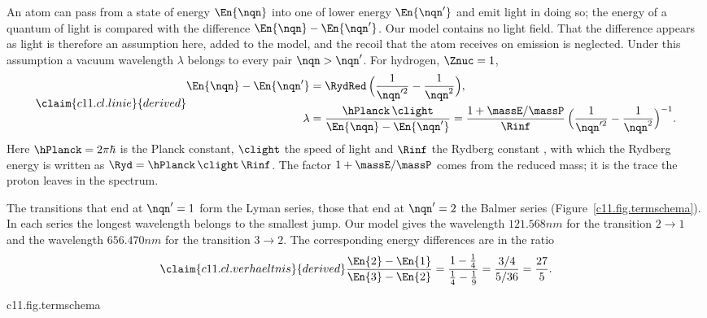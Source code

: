 An atom can pass from a state of energy $\En{\nqn}$ into one of lower energy
$\En{\nqn'}$ and emit light in doing so; the energy of a quantum of light is compared
with the difference $\En{\nqn} - \En{\nqn'}$. Our model contains no light field. That
the difference appears as light is therefore an assumption here, added to the model, and
the recoil that the atom receives on emission is neglected. Under this assumption a
vacuum wavelength $\lambda$ belongs to every pair $\nqn > \nqn'$. For hydrogen,
$\Znuc = 1$,
\begin{equation}\label{c11.eq.linie}\claim{c11.cl.linie}{derived}
  \begin{aligned}
    \En{\nqn} - \En{\nqn'} &= \RydRed\,\Bigl(\frac{1}{\nqn'^2} - \frac{1}{\nqn^2}\Bigr), \\
    \lambda &= \frac{\hPlanck\,\clight}{\En{\nqn} - \En{\nqn'}}
             = \frac{1 + \massE/\massP}{\Rinf}\,
               \Bigl(\frac{1}{\nqn'^2} - \frac{1}{\nqn^2}\Bigr)^{-1} .
  \end{aligned}
\end{equation}
Here $\hPlanck = 2\pi\hbar$ is the Planck constant, $\clight$ the speed of light and
$\Rinf$ the Rydberg constant , with which
the Rydberg energy is written as $\Ryd = \hPlanck\,\clight\,\Rinf$. The factor $1 + \massE/\massP$ comes from the reduced
mass; it is the trace the proton leaves in the spectrum.

The transitions that end at $\nqn' = 1$ form the Lyman series, those that end at
$\nqn' = 2$ the Balmer series (Figure~\ref{c11.fig.termschema}). In each series the
longest wavelength belongs to the smallest jump. Our model gives the wavelength
$\num[c11.cl.lyman]{121.568}{nm}$ for the transition $2 \to 1$ and the wavelength
$\num[c11.cl.balmer]{656.470}{nm}$ for the transition $3 \to 2$. The corresponding energy
differences are in the ratio
\begin{equation}\label{c11.eq.verhaeltnis}\claim{c11.cl.verhaeltnis}{derived}
  \frac{\En{2} - \En{1}}{\En{3} - \En{2}}
  = \frac{1 - \tfrac14}{\tfrac14 - \tfrac19}
  = \frac{3/4}{5/36} = \frac{27}{5} .
\end{equation}

\begin{tpcfigure}{c11.fig.termschema}
  \caption{The term scheme of the relative motion: the energies $\En{\nqn}$ of
    \eqref{c11.eq.energien} for $\Znuc = 1$ in units of $\RydRed$. The levels accumulate
    at $E = 0$. The arrows are transitions; their length is the energy difference, to
    scale. Solid: Lyman series, $\nqn \to 1$. Dashed: Balmer series, $\nqn \to 2$.}
\end{tpcfigure}

